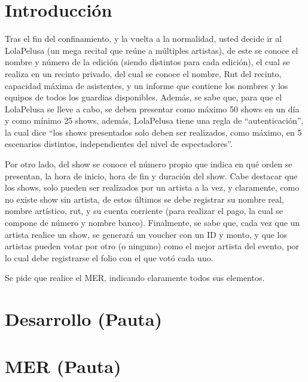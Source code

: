 \documentclass[letterpaper]{article}
\begin{document}
\section{Introducción}

Tras el fin del confinamiento, y la vuelta a la normalidad, usted decide ir al LolaPelusa (un mega recital que reúne a múltiples artistas), de este se conoce el nombre y número de la edición (siendo distintos para cada edición), el cual se realiza en un recinto privado, del cual se conoce el nombre, Rut del recinto, capacidad máxima de asistentes, y un informe que contiene los nombres y los equipos de todos los guardias disponibles. Además, se sabe que, para que el LolaPelusa se lleve a cabo, se deben presentar como máximo 50 shows en un día y como mínimo 25 shows, además, LolaPelusa tiene una regla de “autenticación”, la cual dice “los shows presentados solo deben ser realizados, como máximo, en 5 escenarios distintos, independientes del nivel de espectadores”.

Por otro lado, del show se conoce el número propio que indica en qué orden se presentan, la hora de inicio, hora de fin y duración del show. Cabe destacar que los shows, solo pueden ser realizados por un artista a la vez, y claramente, como no existe show sin artista, de estos últimos se debe registrar su nombre real, nombre artístico, rut, y su cuenta corriente (para realizar el pago, la cual se compone de número y nombre banco). Finalmente, se sabe que, cada vez que un artista realice un show, se generará un voucher con un ID y monto, y que los artistas pueden votar por otro (o ninguno) como el mejor artista del evento, por lo cual debe registrarse el folio con el que votó cada uno.

Se pide que realice el MER, indicando claramente todos sus elementos.

\section{Desarrollo (Pauta)}


\newpage

\section{MER (Pauta)}
\end{document}
